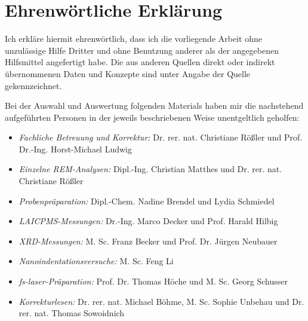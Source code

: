 \chapter{Ehrenwörtliche Erklärung}

Ich erkläre hiermit ehrenwörtlich, dass ich die vorliegende Arbeit ohne unzulässige Hilfe Dritter und ohne Benutzung anderer als der angegebenen Hilfsmittel angefertigt habe.
Die aus anderen Quellen direkt oder indirekt übernommenen Daten und Konzepte sind unter Angabe der Quelle gekennzeichnet.

Bei der Auswahl und Auswertung folgenden Materials haben mir die nachstehend aufgeführten Personen in der jeweils beschriebenen Weise unentgeltlich geholfen:

\ifdefined\PRINTABLE
  \begin{itemize}
    \item \textit{Fachliche Betreuung und Korrektur:} Dr. rer. nat. Christiane Rößler und Prof. Dr.-Ing. Horst-Michael Ludwig
    \item \textit{Einzelne REM-Analysen:} Dipl.-Ing. Christian Matthes und Dr. rer. nat. Christiane Rößler
    \item \textit{Probenpräparation:} Dipl.-Chem. Nadine Brendel und Lydia Schmiedel
    \item \textit{\acs*{LAICPMS}-Messungen:} Dr.-Ing. Marco Decker und Prof. Harald Hilbig
    \item \textit{\acs*{XRD}-Messungen:} M. Sc. Franz Becker und Prof. Dr. Jürgen Neubauer
    \item \textit{Nanoindentationsversuche:} M. Sc. Feng Li
    \item \textit{\acs*{fs-laser}-Präparation:} Prof. Dr. Thomas Höche und M. Sc. Georg Schusser
    \item \textit{Korrekturlesen:} Dr. rer. nat. Michael Böhme, M. Sc. Sophie Unbehau und Dr. rer. nat. Thomas Sowoidnich
  \end{itemize}
\else
